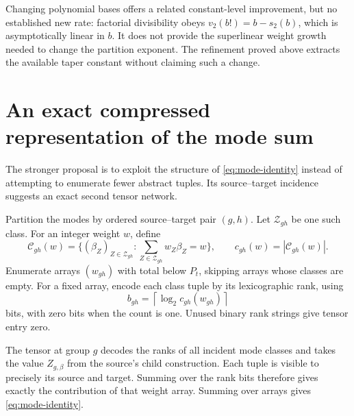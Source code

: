 \documentclass[11pt,letterpaper]{article}
\numberwithin{equation}{section}
\theoremstyle{definition}
\theoremstyle{remark}
\newcommand{\vTwo}{v_2}
\newcommand{\ceil}[1]{\left\lceil #1\right\rceil}
\begin{document}
Changing polynomial bases offers a related constant-level improvement,
but no established new rate: factorial divisibility obeys
$\vTwo(b!)=b-s_2(b)$, which is asymptotically linear in $b$. It does not
provide the superlinear weight growth needed to change the partition
exponent. The refinement proved above extracts the available taper
constant without claiming such a change.

\section{An exact compressed representation of the mode sum}
\label{sec:compressed}

The stronger proposal is to exploit the structure of
\eqref{eq:mode-identity} instead of attempting to enumerate fewer abstract
tuples. Its source--target incidence suggests an exact second tensor
network.

Partition the modes by ordered source--target pair $(g,h)$. Let
$\mathcal Z_{gh}$ be one such class. For an integer weight $w$, define
\[
 \mathcal C_{gh}(w)=
 \{(\beta_Z)_{Z\in\mathcal Z_{gh}}:
                       \sum_{Z\in\mathcal Z_{gh}}w_Z\beta_Z=w\},
 \qquad c_{gh}(w)=|\mathcal C_{gh}(w)|.
\]
Enumerate arrays $(w_{gh})$ with total below $P_t$, skipping arrays whose
classes are empty. For a fixed array, encode each class tuple by its
lexicographic rank, using
\[
 b_{gh}=\ceil{\log_2 c_{gh}(w_{gh})}
\]
bits, with zero bits when the count is one. Unused binary rank strings
give tensor entry zero.

The tensor at group $g$ decodes the ranks of all incident mode classes
and takes the value $Z_{g,\beta}$ from the source's child construction.
Each tuple is visible to precisely its source and target. Summing over
the rank bits therefore gives exactly the contribution of that weight
array. Summing over arrays gives \eqref{eq:mode-identity}.
\end{document}
